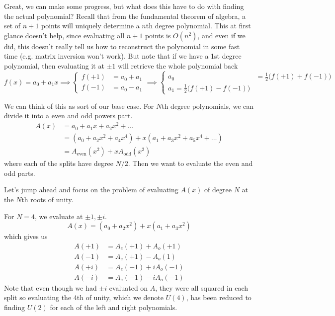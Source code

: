   Great, we can make some progress, but what does this have to do with finding the actual polynomial? Recall that from the fundamental theorem of algebra, a set of $n+1$ points will uniquely determine a $n$th degree polynomial. This at first glance doesn't help, since evaluating all $n+1$ points is $O(n^2)$, and even if we did, this doesn't really tell us how to reconstruct the polynomial in some fast time (e.g. matrix inversion won't work). But note that if we have a 1st degree polynomial, then evaluating it at $\pm1$ will retrieve the whole polynomial back
  \begin{equation}
    f(x) = a_0 + a_1 x \implies \begin{cases} f(+1) & = a_0 + a_1 \\ f(-1) & = a_0 - a_1 \end{cases} \implies \begin{cases} a_0 & = \frac{1}{2} \big( f(+1) + f(-1) \big) \\ a_1 = \frac{1}{2} \big( f(+1) - f(-1) \big) \end{cases}
  \end{equation}

  We can think of this as sort of our base case. For $N$th degree polynomials, we can divide it into a even and odd powers part. 
  \begin{align}
    A(x) & = a_0 + a_1 x + a_2 x^2 + \ldots \\ 
         & = (a_0 + a_2 x^2 + a_4 x^4) + x (a_1 + a_3 x^2 + a_5 x^4 + \ldots ) \\
         & = A_{\mathrm{even}} (x^2) + x A_{\mathrm{odd}} (x^2) 
  \end{align}
  where each of the splits have degree $N/2$. Then we want to evaluate the even and odd parts. 

  Let's jump ahead and focus on the problem of evaluating $A(x)$ of degree $N$ at the $N$th roots of unity. 

  \begin{example}
    For $N = 4$, we evaluate at $\pm 1, \pm i$. 
    \begin{equation}
      A(x) = (a_0 + a_2 x^2) + x (a_1 + a_3 x^2) 
    \end{equation}
    which gives us 
    \begin{align}
      A(+1) & = A_e (+1) + A_o (+1) \\ 
      A(-1) & = A_e (+1) - A_o (1) \\ 
      A(+i) & = A_e (-1) + i A_o (-1) \\ 
      A(-i) & = A_e (-1) - i A_o (-1) 
    \end{align}
    Note that even though we had $\pm i$ evaluated on $A$, they were all squared in each split so evaluating the 4th of unity, which we denote $U(4)$, has been reduced to finding $U(2)$ for each of the left and right polynomials. 
  \end{example}

